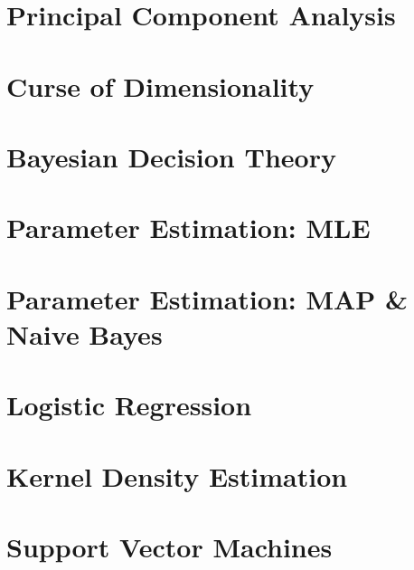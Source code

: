 \documentclass[12pt]{article}
\theoremstyle{definition}
\begin{document}
\section{Principal Component Analysis}
\section{Curse of Dimensionality}
\section{Bayesian Decision Theory}
\section{Parameter Estimation: MLE}
\section{Parameter Estimation: MAP \& Naive Bayes}
\section{Logistic Regression}
\section{Kernel Density Estimation}
\section{Support Vector Machines}
\end{document}
